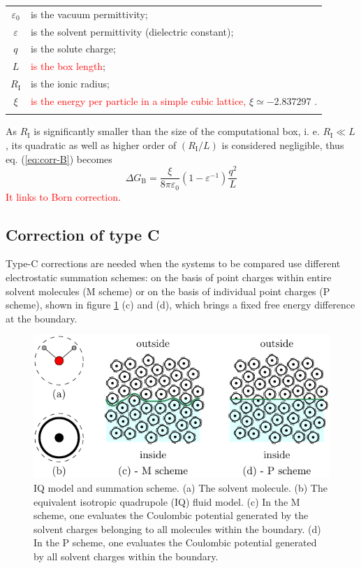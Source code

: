 \begin{tabular}{cl}
 $\varepsilon_{0}$ & is the vacuum permittivity;\tabularnewline
$\varepsilon$ & is the solvent permittivity (dielectric constant);\tabularnewline
$q$ & is the solute charge;\tabularnewline
$L$ & \textcolor{red}{is the box length};\tabularnewline
$R_{\mathrm{I}}$ & is the ionic radius;\tabularnewline
$\xi$ & \textcolor{red}{is the energy per particle in a simple cubic lattice,}
$\xi\simeq-2.837297$ \citep{nijboer}.\tabularnewline
 & \tabularnewline
\end{tabular} 

As $R_{\mathrm{I}}$ is significantly smaller than the size of the
computational box, i. e. $R_{\mathrm{I}}\ll L$, its quadratic as
well as higher order of $\left(R_{\mathrm{I}}/L\right)$ is considered
negligible, thus eq. (\ref{eq:corr-B}) becomes
\begin{equation}
\Delta G_{\mathrm{B}}=\frac{\xi}{8\pi\varepsilon_{0}}\left(1-\varepsilon^{-1}\right)\frac{q^{2}}{L}
\end{equation}
\textcolor{red}{It links to Born correction}.


\subsection{Correction of type C}

Type-C corrections are needed when the systems to be compared use
different electrostatic summation schemes: on the basis of point charges
within entire solvent molecules (M scheme) or on the basis of individual
point charges (P scheme), shown in figure \ref{fig:IQ-model-som-scheme}
(c) and (d), which brings a fixed free energy difference at the boundary.

\begin{figure}[h]
\begin{centering}
\includegraphics{_figure/ion_correction}
\par\end{centering}

\caption[IQ model and summation scheme]{IQ model and summation scheme. (a) The solvent molecule. (b) The
equivalent isotropic quadrupole (IQ) fluid model. (c) In the M scheme,
one evaluates the Coulombic potential generated by the solvent charges
belonging to all molecules within the boundary. (d) In the P scheme,
one evaluates the Coulombic potential generated by all solvent charges
within the boundary.\label{fig:IQ-model-som-scheme}}
\end{figure}


